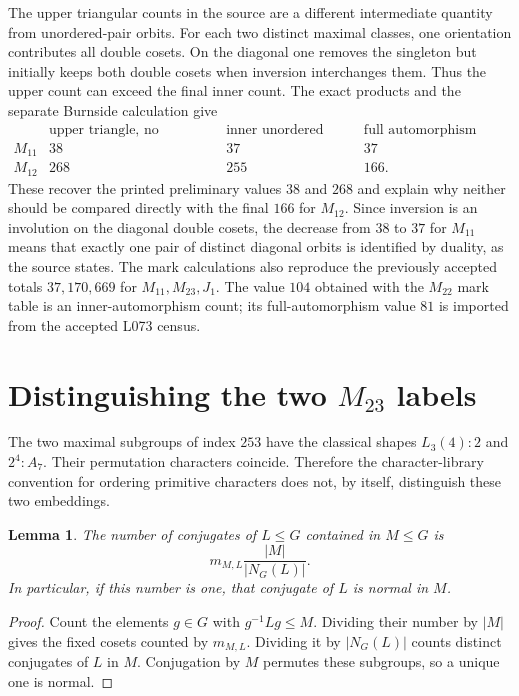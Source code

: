 \documentclass[11pt]{article}
\newtheorem{lemma}[theorem]{Lemma}
\begin{document}
The upper triangular counts in the source are a different intermediate
quantity from unordered-pair orbits. For each two distinct maximal classes,
one orientation contributes all double cosets. On the diagonal one removes
the singleton but initially keeps both double cosets when inversion
interchanges them. Thus the upper count can exceed the final inner count.
The exact products and the separate Burnside calculation give
\[
\begin{array}{c|rrr}
 &\text{upper triangle, no singletons}&\text{inner unordered pairs}
 &\text{full automorphism pairs}\\\hline
 M_{11}&38&37&37\\
 M_{12}&268&255&166.
\end{array}
\]
These recover the printed preliminary values $38$ and $268$ and explain
why neither should be compared directly with the final $166$ for $M_{12}$.
Since inversion is an involution on the diagonal double cosets, the decrease
from $38$ to $37$ for $M_{11}$ means that exactly one pair of distinct
diagonal orbits is identified by duality, as the source states.
The mark calculations also reproduce the previously accepted totals
$37,170,669$ for $M_{11},M_{23},J_1$. The value $104$ obtained with the
$M_{22}$ mark table is an inner-automorphism count; its full-automorphism
value $81$ is imported from the accepted L073 census.

\section{Distinguishing the two $M_{23}$ labels}
The two maximal subgroups of index $253$ have the classical shapes
$L_3(4):2$ and $2^4:A_7$. Their permutation characters coincide. Therefore
the character-library convention for ordering primitive characters does
not, by itself, distinguish these two embeddings.

\begin{lemma}
The number of conjugates of $L\leq G$ contained in $M\leq G$ is
\[
                 m_{M,L}\frac{|M|}{|N_G(L)|}.
\]
In particular, if this number is one, that conjugate of $L$ is normal in $M$.
\end{lemma}
\begin{proof}
Count the elements $g\in G$ with $g^{-1}Lg\leq M$. Dividing their number
by $|M|$ gives the fixed cosets counted by $m_{M,L}$. Dividing it by
$|N_G(L)|$ counts distinct conjugates of $L$ in $M$. Conjugation by $M$
permutes these subgroups, so a unique one is normal.
\end{proof}
\end{document}
